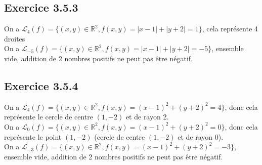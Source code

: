 \documentclass[]{book}
\theoremstyle{definition}
\newcommand{\bb}[1]{\mathbb{#1}}
\newcommand{\R}{\bb{R}}
\begin{document}
\begin{center}
\end{center}

\subsection*{Exercice 3.5.3}
On a $\mathscr{L}_{4}(f) = \{ (x,y) \in \R^2, f(x,y) = |x-1|+|y+2| = 1\}$, cela repr\'esente 4 droites\\
On a $\mathscr{L}_{-5}(f) = \{ (x,y) \in \R^2, f(x,y) = |x-1|+|y+2| = -5\}$, ensemble vide, addition de 2 nombres positifs ne peut pas \^etre n\'egatif.\\

\begin{center}
\end{center}


\subsection*{Exercice 3.5.4}
On a $\mathscr{L}_{4}(f) = \{ (x,y) \in \R^2, f(x,y) = (x-1)^2+(y+2)^2 = 4\}$, donc cela repr\'esente le cercle de centre $(1,-2)$ et de rayon 2.\\
On a $\mathscr{L}_{0}(f) = \{ (x,y) \in \R^2, f(x,y) = (x-1)^2+(y+2)^2 = 0\}$, donc cela repr\'esente le point $(1,-2)$ (cercle de centre $(1,-2)$ et de rayon 0).\\
On a $\mathscr{L}_{-3}(f) = \{ (x,y) \in \R^2, f(x,y) = (x-1)^2+(y+2)^2 = -3\}$, ensemble vide, addition de 2 nombres positifs ne peut pas \^etre n\'egatif.\\
\end{document}
